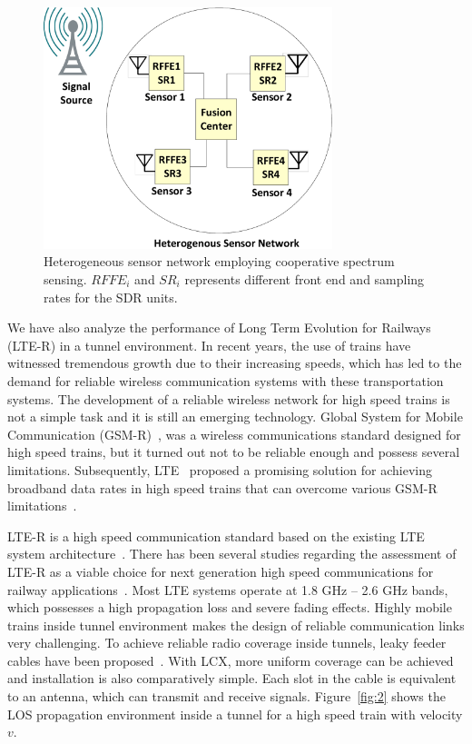 \begin{figure}[!ht]
\label{fig:1}
\centering
\includegraphics[width=0.75\textwidth,keepaspectratio]{images/Gill/figs/introdiag.eps} 
\caption{Heterogeneous sensor network employing cooperative spectrum sensing. $RFFE_i$ and $SR_i$ represents different front end and sampling rates for the SDR units.}
\end{figure}

We have also analyze the performance of Long Term Evolution for Railways (LTE-R) in a tunnel environment. In recent years, the use of trains have witnessed tremendous growth due to their increasing speeds, which has led to the demand for reliable wireless communication systems with these transportation systems. The development of a reliable wireless network for high speed trains is not a simple task and it is still an emerging technology. Global System for Mobile Communication (GSM-R)~\cite{trlter1}, was a wireless communications standard designed for high speed trains, but it turned out not to be reliable enough and possess several limitations. Subsequently, LTE~\cite{trlter2} proposed a promising solution for achieving broadband data rates in high speed trains that can overcome various GSM-R limitations~\cite{arlter3,inplter4}. 

LTE-R is a high speed communication standard based on the existing LTE system architecture~\cite{inplter4}. There has been several studies regarding the assessment of LTE-R as a viable choice for next generation high speed communications for railway applications~\cite{inplter5,inplter6}. Most LTE systems operate at 1.8 GHz -- 2.6 GHz bands, which possesses a high propagation loss and severe fading effects. Highly mobile trains inside tunnel environment makes the design of reliable communication links very challenging. To achieve reliable radio coverage inside tunnels, leaky feeder cables have been proposed~\cite{arlter7}. With LCX, more uniform coverage can be achieved and installation is also comparatively simple. Each slot in the cable is equivalent to an antenna, which can transmit and receive signals. Figure~\ref{fig:2} shows the LOS propagation environment inside a tunnel for a high speed train with velocity $v$.

